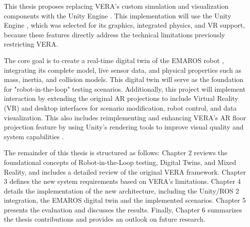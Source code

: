 This thesis proposes replacing VERA’s custom simulation and visualization components \cite{Geh24} with the Unity Engine \cite{Uni23}. This implementation will use the Unity Engine \cite{Uni23}, which was selected for its graphics, integrated physics, and VR support, because these features directly address the technical limitations previously restricting VERA.

The core goal is to create a real-time digital twin \cite{AA23} of the EMAROS robot \cite{Geh24}, integrating its complete model, live sensor data, and physical properties such as mass, inertia, and collision models. This digital twin will serve as the foundation for "robot-in-the-loop" \cite{Hu05} testing scenarios. Additionally, this project will implement interaction by extending the original AR projections \cite{Geh24} to include Virtual Reality (VR) \cite{EM21} and desktop interfaces for scenario modification, robot control, and data visualization. This also includes reimplementing and enhancing VERA's AR floor projection feature by using Unity's rendering tools to improve visual quality and system capabilities \cite{Uni23}.

\cite{NOT FINAL}The remainder of this thesis is structured as follows: Chapter 2 reviews the foundational concepts of Robot-in-the-Loop testing, Digital Twins, and Mixed Reality, and includes a detailed review of the original VERA framework. Chapter 3 defines the new system requirements based on VERA's limitations. Chapter 4 details the implementation of the new architecture, including the Unity/ROS 2 integration, the EMAROS digital twin and the implemented scenarios. Chapter 5 presents the evaluation and discusses the results. Finally, Chapter 6 summarizes the thesis contributions and provides an outlook on future research.\cite{NOT FINAL}

